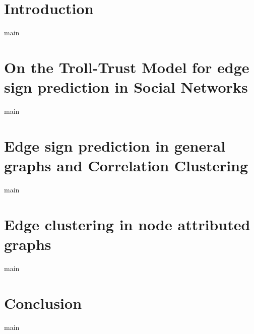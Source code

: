 \documentclass[a4paper,svgnames,twoside,onecolumn,final,titlepage,11pt]{book}
\begin{document}


\mainmatter
\pagestyle{fancy}

\chapter{Introduction}
{main}

\chapter{On the Troll-Trust Model for edge sign prediction in Social Networks}
{main}

\chapter{Edge sign prediction in general graphs and Correlation Clustering}
{main}

\chapter{Edge clustering in node attributed graphs}
{main}

\chapter{Conclusion}
{main}

\backmatter
\vspace{\baselineskip}
\begingroup
{}
\setlength\bibitemsep{1pt}
\printbibliography
\restoregeometry
\endgroup
\end{document}
